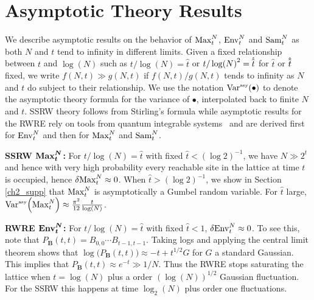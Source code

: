 \section{Asymptotic Theory Results}
We describe asymptotic results on the behavior of $\mathrm{Max}^{N}_t$, $\mathrm{Env}^{N}_t$ and $\mathrm{Sam}^{N}_t$ as both $N$ and $t$ tend to infinity in different limits. Given a fixed relationship between $t$ and $\log(N)$ such as $t/\log(N)=\hat{t}$ or  $t/\log(N)^2=\hathat{t}$ for $\hat{t}$ or $\hathat{t}$ fixed, we write $f(N,t)\gg g(N,t)$ if $f(N,t)/g(N,t)$ tends to infinity as $N$ and $t$ do subject to their relationship. We use the notation $\mathrm{Var}^{\textrm{\tiny{asy}}}\!\left(\bullet\right)$ to denote the asymptotic theory formula for the variance of $\bullet$, interpolated back to finite $N$ and $t$. SSRW theory follows from Stirling's formula while asymptotic results for the RWRE rely on tools from quantum integrable systems~\cite{barraquand_random-walk_2017, barraquand_moderate_2020,krajenbrink_crossover_2022} and are derived first for $\mathrm{Env}^{N}_t$ and then for $\mathrm{Max}^{N}_t$ and $\mathrm{Sam}^{N}_t$.

\noindent\textbf{SSRW $\boldsymbol{\mathrm{Max}^{N}_t}$:}
For $t/\log(N)=\hat{t}$ with fixed $\hat{t} < (\log 2)^{-1}$, we have $N\gg 2^t$ and hence with very high probability every reachable site in the lattice at time $t$ is occupied, hence $\var{\mathrm{Max}^{N}_t}\approx 0$. When $\hat{t} > (\log 2)^{-1}$, we show  in  Section \ref{ch2_supp} that $\mathrm{Max}^{N}_t$ is asymptotically a Gumbel random variable. For $\hat{t}$ large, $\mathrm{Var}^{\textrm{\tiny{asy}}}\!\left(\mathrm{Max}^{N}_t\right) \approx \frac{\pi^2}{12} \frac{t}{\log(N)}$.


\noindent\textbf{RWRE $\boldsymbol{\mathrm{Env}^{N}_t}$:}
For $t/\log(N)=\hat{t}$ with fixed $\hat{t}<1$, $\var{\mathrm{Env}^{N}_t}\approx 0$. To see this, note that $P_\mathbf{B}(t,t) = B_{0,0} \cdots B_{t-1,t-1}$. Taking logs and applying the central limit theorem shows that $\log \big(P_\mathbf{B}(t,t)\big) \approx -t  + t^{1/2} G$ for $G$ a standard Gaussian. This implies that $P_\mathbf{B}(t,t) \approx e^{-t}\gg 1/N$. Thus the RWRE stops saturating the lattice when $t= \log(N)$ plus a order $(\log(N))^{1/2}$ Gaussian fluctuation. For the SSRW this happens at time $\log_2(N)$ plus order one fluctuations.


